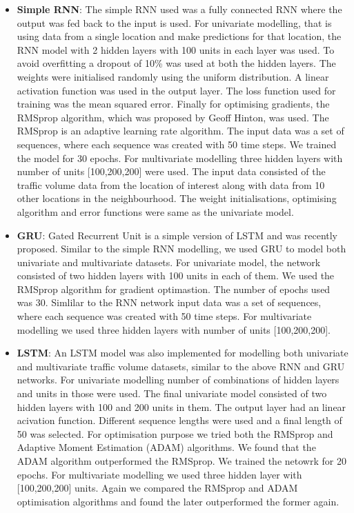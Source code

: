 \begin{itemize}

\item \textbf{Simple RNN}: The simple RNN used was a fully connected RNN where the output was fed
back to the input is used. For univariate modelling, that is using data from a single location and
make predictions for that location, the RNN model with 2 hidden layers with 100 units in each
layer was used. To avoid overfitting a dropout of 10\% was used at both the hidden layers. The weights
were initialised randomly using the uniform distribution. A linear activation function was used
in the output layer. The loss function used for training was the mean squared error. Finally for
optimising gradients, the RMSprop algorithm, which was proposed by Geoff Hinton, was used.
The RMSprop is an adaptive learning rate algorithm. The input data was a set of sequences, where
each sequence was created with 50 time steps. We trained the model for 30 epochs.
For multivariate modelling three hidden layers with number of units [100,200,200] were used.
The input data consisted of the traffic volume data from the location of interest along with data
from 10 other locations in the neighbourhood. The weight initialisations, optimising algorithm and
error functions were same as the univariate model.

\item \textbf{GRU}: Gated Recurrent Unit is a simple version of LSTM and was recently proposed.
Similar to the simple RNN modelling, we used GRU to model both univariate and multivariate datasets.
For univariate model, the network consisted of two hidden layers with 100 units in each of them.
We used the RMSprop algorithm for gradient optimastion. The number of epochs used was 30. Simlilar to
the RNN network input data was a set of sequences, where each sequence was created with 50 time steps.
For multivariate modelling we used three hidden layers with number of units [100,200,200].

\item \textbf{LSTM}: An LSTM model was also implemented for modelling both univariate and multivariate
traffic volume datasets, similar to the above RNN and GRU networks. For univariate modelling number
of combinations of hidden layers and units in those were used. The final univariate model consisted
of two hidden layers with 100 and 200 units in them. The output layer had an linear acivation function.
Different sequence lengths were used and a final length of 50 was selected. For optimisation purpose
we tried both the RMSprop and Adaptive Moment Estimation (ADAM) algorithms. We found that the
ADAM algorithm outperformed the RMSprop. We trained the netowrk for 20 epochs. For multivariate
modelling we used three hidden layer with [100,200,200] units. Again we compared the RMSprop and ADAM
optimisation algorithms and found the later outperformed the former again.

\end{itemize}


